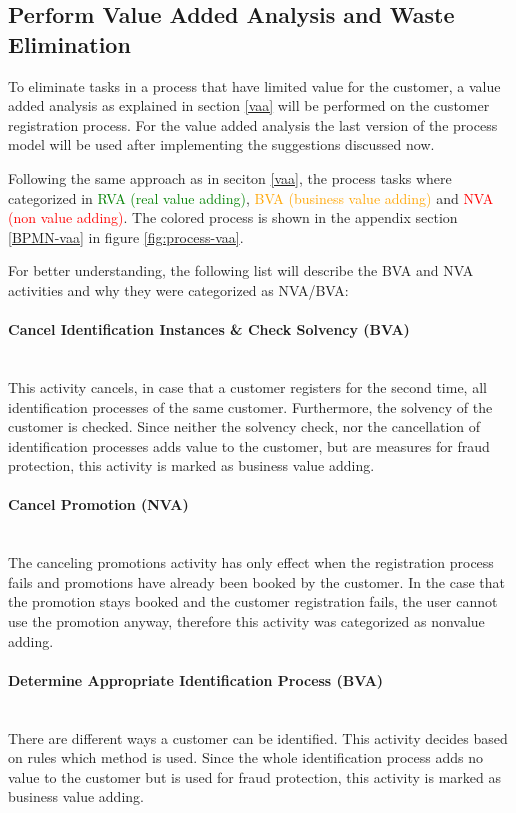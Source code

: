 \subsection{Perform Value Added Analysis and Waste Elimination}\label{improv-vaa}
To eliminate tasks in a process that have limited value for the customer, a value added analysis as explained in section \ref{vaa} will be performed on the customer registration process. For the value added analysis the last version of the process model will be used after implementing the suggestions discussed now. 

Following the same approach as in seciton \ref{vaa}, the process tasks where categorized in \textcolor{green}{RVA (real value adding)}, \textcolor{orange}{BVA (business value adding)} and \textcolor{red}{NVA (non value adding)}. The colored process is shown in the appendix section \ref{BPMN-vaa} in figure \ref{fig:process-vaa}.

For better understanding, the following list will describe the BVA and NVA activities and why they were categorized as NVA/BVA:

\paragraph{Cancel Identification  Instances \& Check Solvency (BVA)}~\\ 
This activity cancels, in case that a customer registers for the second time, all identification processes of the same customer. Furthermore, the solvency of the customer is checked. Since neither the solvency check, nor the cancellation of identification processes adds value to the customer, but are measures for fraud protection, this activity is marked as business value adding. 
\paragraph{Cancel Promotion (NVA)}~\\ 
The canceling promotions activity has only effect when the registration process fails and promotions have already been booked by the customer. In the case that the promotion stays booked and the customer registration fails, the user cannot use the promotion anyway, therefore this activity was categorized as nonvalue adding.
\paragraph{Determine Appropriate Identification Process (BVA)}~\\ 
There are different ways a customer can be identified. This activity decides based on rules which method is used. Since the whole identification process adds no value to the customer but is used for fraud protection, this activity is marked as business value adding. 

